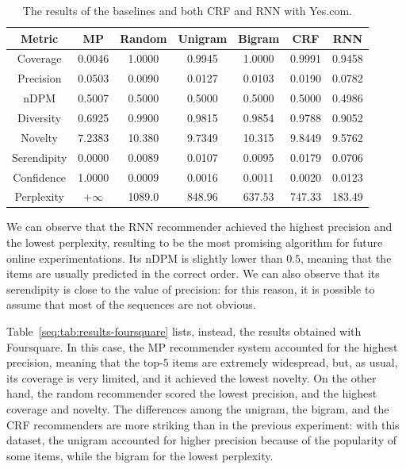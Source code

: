 \begin{table}
\centering
\begin{tabular}{@{}ccccccc@{}}
\toprule
Metric      & MP        & Random & Unigram & Bigram & CRF    & RNN    \\ \midrule
Coverage    & 0.0046    & 1.0000 & 0.9945  & 1.0000 & 0.9991 & 0.9458 \\
Precision   & 0.0503    & 0.0090 & 0.0127  & 0.0103 & 0.0190 & 0.0782 \\
nDPM        & 0.5007    & 0.5000 & 0.5000  & 0.5000 & 0.5000 & 0.4986 \\
Diversity   & 0.6925    & 0.9900 & 0.9815  & 0.9854 & 0.9788 & 0.9052 \\
Novelty     & 7.2383    & 10.380 & 9.7349  & 10.315 & 9.8449 & 9.5762 \\
Serendipity & 0.0000    & 0.0089 & 0.0107  & 0.0095 & 0.0179 & 0.0706 \\
Confidence  & 1.0000    & 0.0009 & 0.0016  & 0.0011 & 0.0020 & 0.0123 \\
Perplexity  & $+\infty$ & 1089.0 & 848.96  & 637.53 & 747.33 & 183.49 \\ \bottomrule
\end{tabular}
\caption[Experimental results with Yes.com]{The results of the baselines and both CRF and RNN with Yes.com.}
\label{seq:tab:results-yes}
\end{table}

We can observe that the RNN recommender achieved the highest precision and the lowest perplexity, resulting to be the most promising algorithm for future online experimentations. Its nDPM is slightly lower than $0.5$, meaning that the items are usually predicted in the correct order. We can also observe that its serendipity is close to the value of precision: for this reason, it is possible to assume that most of the sequences are not obvious.

Table~\ref{seq:tab:results-foursquare} lists, instead, the results obtained with Foursquare. In this case, the MP recommender system accounted for the highest precision, meaning that the top-$5$ items are extremely widespread, but, as usual, its coverage is very limited, and it achieved the lowest novelty. On the other hand, the random recommender scored the lowest precision, and the highest coverage and novelty. The differences among the unigram, the bigram, and the CRF recommenders are more striking than in the previous experiment: with this dataset, the unigram accounted for higher precision because of the popularity of some items, while the bigram for the lowest perplexity.


